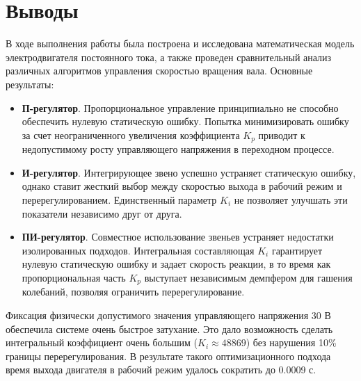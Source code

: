 \documentclass[12pt,a4paper]{extarticle}
\begin{document}
    \section{Выводы}
    В ходе выполнения работы была построена и исследована математическая модель электродвигателя постоянного тока, а также проведен сравнительный анализ различных алгоритмов управления скоростью вращения вала.  Основные результаты:
    \begin{itemize}
    \item\textbf{П-регулятор}. Пропорциональное управление принципиально не способно обеспечить нулевую статическую ошибку. Попытка минимизировать ошибку за счет неограниченного увеличения коэффициента $K_p$ приводит к недопустимому росту управляющего напряжения в переходном процессе.
    \item\textbf{И-регулятор}. Интегрирующее звено успешно устраняет статическую ошибку, однако ставит жесткий выбор между скоростью выхода в рабочий режим и перерегулированием. Единственный параметр $K_i$ не позволяет улучшать эти показатели независимо друг от друга.
    \item\textbf{ПИ-регулятор}. Совместное использование звеньев устраняет недостатки изолированных подходов. Интегральная составляющая $K_i$ гарантирует нулевую статическую ошибку и задает скорость реакции, в то время как пропорциональная часть $K_p$ выступает независимым демпфером для гашения колебаний, позволяя ограничить перерегулирование.
    \end{itemize}
    Фиксация физически допустимого значения управляющего напряжения 30 В обеспечила системе очень быстрое затухание. Это дало возможность сделать интегральный коэффициент очень большим ($K_i \approx 48869$) без нарушения 10\% границы перерегулирования. В результате такого оптимизационного подхода время выхода двигателя в рабочий режим удалось сократить до 0.0009 с.
    
\end{document}
